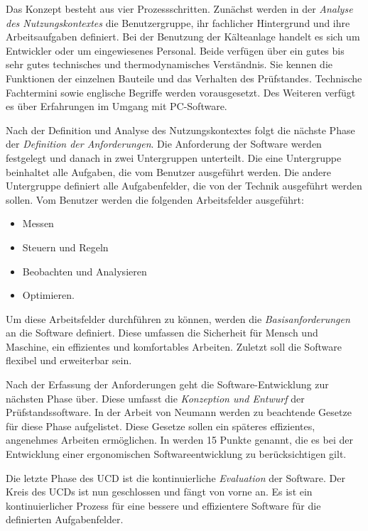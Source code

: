 Das Konzept besteht aus vier Prozessschritten. Zunächst werden in der \textit{Analyse des Nutzungskontextes} die Benutzergruppe, ihr fachlicher Hintergrund und ihre Arbeitsaufgaben definiert. Bei der Benutzung der Kälteanlage handelt es sich um Entwickler oder um eingewiesenes Personal. Beide verfügen über ein gutes bis sehr gutes technisches und thermodynamisches Verständnis. Sie kennen die Funktionen der einzelnen Bauteile und das Verhalten des Prüfstandes. Technische Fachtermini sowie englische Begriffe werden vorausgesetzt.  Des Weiteren verfügt es über Erfahrungen im Umgang mit PC-Software.

Nach der Definition und Analyse des Nutzungskontextes folgt die nächste Phase der \textit{Definition der Anforderungen}. Die Anforderung der Software werden festgelegt und danach in zwei Untergruppen unterteilt. Die eine Untergruppe beinhaltet alle Aufgaben, die vom Benutzer ausgeführt werden. Die andere Untergruppe definiert alle Aufgabenfelder, die von der Technik ausgeführt werden sollen. 
Vom Benutzer werden die folgenden Arbeitsfelder ausgeführt:

\begin{itemize}
\item	Messen
\item	Steuern und Regeln
\item	Beobachten und Analysieren
\item	Optimieren.
\end{itemize}

Um diese Arbeitsfelder durchführen zu können, werden die \textit{Basisanforderungen} an die Software definiert. Diese umfassen die Sicherheit für Mensch und Maschine, ein effizientes und komfortables Arbeiten. Zuletzt soll die Software flexibel und erweiterbar sein. 

Nach der Erfassung der Anforderungen geht die Software-Entwicklung zur nächsten Phase über. Diese umfasst die \textit{Konzeption und Entwurf} der Prüfstandssoftware. In der Arbeit von Neumann \citep{Neumann2007} werden zu beachtende Gesetze für diese Phase aufgelistet. Diese Gesetze sollen ein späteres effizientes, angenehmes Arbeiten ermöglichen. In \citep{Preim2013} werden 15 Punkte genannt, die es bei der Entwicklung einer ergonomischen Softwareentwicklung zu berücksichtigen gilt.

Die letzte Phase des UCD ist die kontinuierliche \textit{Evaluation} der Software. Der Kreis des UCDs ist nun geschlossen und fängt von vorne an. Es ist ein kontinuierlicher Prozess für eine bessere und effizientere Software für die definierten Aufgabenfelder. 

